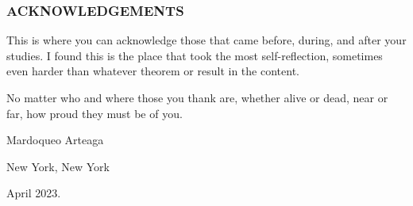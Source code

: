 
\begin{center}
\subsubsection*{ACKNOWLEDGEMENTS}
\end{center}

\singlespacing
This is where you can acknowledge those that came before, during, and after your studies. I found this is the place that took the most self-reflection, sometimes even harder than whatever theorem or result in the content. 

No matter who and where those you thank are, whether alive or dead, near or far, how proud they must be of you. 

Mardoqueo Arteaga

New York, New York

April 2023.

\newpage

\doublespacing